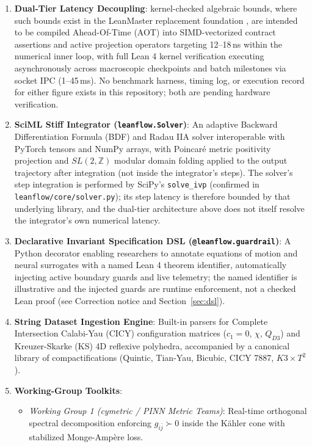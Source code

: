 \documentclass[11pt,a4paper]{article}
\newcommand{\numreconcile}[2]{#1}
\begin{document}
\begin{enumerate}
    \item \textbf{Dual-Tier Latency Decoupling}: kernel-checked algebraic bounds, where such bounds exist in the LeanMaster replacement foundation \cite{leanmaster2026}, are intended to be compiled Ahead-Of-Time (AOT) into SIMD-vectorized contract assertions and active projection operators targeting \numreconcile{12--18}{ns per step}\,ns within the numerical inner loop, with full Lean 4 kernel verification executing asynchronously across macroscopic checkpoints and batch milestones via socket IPC (\numreconcile{1--45}{ms per IPC gate}\,ms). No benchmark harness, timing log, or execution record for either figure exists in this repository; both are pending hardware verification.
    \item \textbf{SciML Stiff Integrator (\texttt{leanflow.Solver})}: An adaptive Backward Differentiation Formula (BDF) and Radau IIA solver interoperable with PyTorch tensors and NumPy arrays, with Poincaré metric positivity projection and $SL(2, \mathbb{Z})$ modular domain folding applied to the output trajectory after integration (not inside the integrator's steps). The solver's step integration is performed by SciPy's \texttt{solve\_ivp} (confirmed in \texttt{leanflow/core/solver.py}); its step latency is therefore bounded by that underlying library, and the dual-tier architecture above does not itself resolve the integrator's own numerical latency.
    \item \textbf{Declarative Invariant Specification DSL (\texttt{@leanflow.guardrail})}: A Python decorator enabling researchers to annotate equations of motion and neural surrogates with a named Lean 4 theorem identifier, automatically injecting active boundary guards and live telemetry; the named identifier is illustrative and the injected guards are runtime enforcement, not a checked Lean proof (see Correction notice and Section~\ref{sec:dsl}).
    \item \textbf{String Dataset Ingestion Engine}: Built-in parsers for Complete Intersection Calabi-Yau (CICY) configuration matrices ($c_1=0$, $\chi$, $Q_{D3}$) and Kreuzer-Skarke (KS) 4D reflexive polyhedra, accompanied by a canonical library of compactifications (Quintic, Tian-Yau, Bicubic, CICY 7887, $K3 \times T^2$).
    \item \textbf{Working-Group Toolkits}:
    \begin{itemize}
        \item \emph{Working Group 1 (cymetric / PINN Metric Teams)}: Real-time orthogonal spectral decomposition enforcing $g_{i\bar{j}} \succ 0$ inside the Kähler cone with stabilized Monge-Ampère loss.

\end{itemize}
\end{enumerate}
\end{document}
